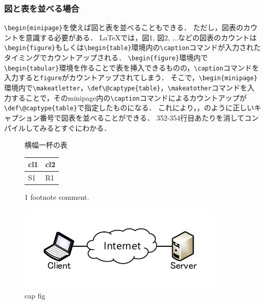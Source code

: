 \documentclass[uplatex]{jsarticle}
\begin{document}
\subsubsection{図と表を並べる場合}
\verb|\begin{minipage}|を使えば図と表を並べることもできる．
ただし，図表のカウントを意識する必要がある．
\LaTeX では，図1, 図2, ...などの図表のカウントは\verb|\begin{figure}|もしくは\verb|\begin{table}|環境内の\verb|\caption|コマンドが入力されたタイミングでカウントアップされる．
\verb|\begin{figure}|環境内で\verb|\begin{tabular}|環境を作ることで表を挿入できるものの，\verb|\caption|コマンドを入力すると\texttt{figure}がカウントアップされてしまう．
そこで，\verb|\begin{minipage}|環境内で\verb|\makeatletter|，\verb|\def\@captype{table}|，\verb|\makeatother|コマンドを入力することで，そのminipage内の\verb|\caption|コマンドによるカウントアップが\verb|\def\@captype{table}|で指定したものになる．
これにより，，のように正しいキャプション番号で図表を並べることができる．
352-354行目あたりを消してコンパイルしてみるとすぐにわかる．

\begin{figure}[ht]
	\centering
	\begin{minipage}[h]{0.47 \textwidth}
		\makeatletter               %
		\def\@captype{table}      %
		\makeatother
		\caption{横幅一杯の表}
		\label{tab:para-tab}
		\begin{threeparttable}
			\begin{tabular*}{\hsize}{ll}   
				\hline \hline
				cl1 & cl2 \tnote{1} \\
				\hline
				S1 & R1 \\
				\hline
			\end{tabular*}
			\begin{tablenotes}\footnotesize
				\item[1] footnote comment.
			\end{tablenotes}
		\end{threeparttable}
	\end{minipage}
	\begin{minipage}[h]{0.49 \textwidth}
		\centering
		\includegraphics[width=1 \linewidth]{fig/figure1.pdf}
		\caption{cap fig}
		\label{fig:para-fig}
	\end{minipage}
\end{figure}
\end{document}
